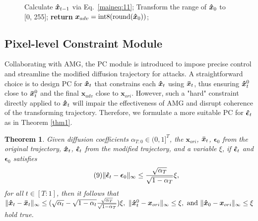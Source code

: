 \documentclass{article}
\newtheorem{theorem}{Theorem}
\begin{document}
\begin{figure}[t]
\begin{minipage}{0.9\linewidth}
\begin{algorithm}[H]
\begin{algorithmic}[1]
            \STATE Calculate $\boldsymbol{\Hat{x}}_{t-1}$ via Eq.~\eqref{maineq:11}; 
        \ENDFOR
        \STATE Transform the range of $\boldsymbol{\Hat{x}}_{0}$ to [0, 255]; 
        \STATE \textbf{return} $\boldsymbol{x}_{adv} = \text{int8}(\text{round}(\boldsymbol{\Hat{x}}_{0}))$; 
    \end{algorithmic}
\label{alg:1}
\end{algorithm}
\end{minipage}
\vspace{-0.4cm}
\end{figure}

\subsection{Pixel-level Constraint Module}
\label{sec:3.3}

Collaborating with AMG, the PC module is introduced to impose precise control and streamline the modified diffusion trajectory for attacks. 
A straightforward choice is to design PC for $\boldsymbol{\Hat{x}}_t$ that constrains each $\boldsymbol{\Hat{x}}_t$ using $\boldsymbol{\Bar{x}}_t$, thus ensuring $\boldsymbol{\Hat{x}}_{t}^{0}$ close to $\boldsymbol{\Bar{x}}_{t}^{0}$ and the final $\boldsymbol{x}_{adv}$ close to $\boldsymbol{x}_{ori}$. However, such a "hard" constraint directly applied to $\boldsymbol{\Hat{x}}_t$ will impair the effectiveness of AMG and disrupt {coherence of the transforming trajectory.} Therefore, we formulate a more suitable PC for $\boldsymbol{\Hat{\epsilon}}_{t}$ as in {Theorem} \ref{thm1}.

\begin{theorem}
\label{mainthm1}
    Given diffusion coefficients $\alpha_{T:0}\in(0,1]^T$, the $\boldsymbol{x}_{ori}$, $\boldsymbol{\Bar{x}}_{t}$, $\boldsymbol{\epsilon}_0$ from the original trajectory, $\boldsymbol{\Hat{x}}_{t}$, $\boldsymbol{\Hat{\epsilon}}_{t}$ from the modified trajectory, and a variable $\xi$, if $\boldsymbol{\Hat{\epsilon}}_{t}$ and $\boldsymbol{{\epsilon}}_{0}$ satisfies 
    \begin{equation}\tag{9}
        \|\boldsymbol{\Hat{\epsilon}}_{t} - \boldsymbol{\epsilon}_{0}\|_{\infty} \leq \frac{\sqrt{\alpha_T}}{\sqrt{1-\alpha_T}}\xi,
    \label{maineq:9}
    \end{equation}
    for all $t\in[T:1]$, then it follows that 
        $\|\boldsymbol{\Hat{x}}_{t} - \boldsymbol{\Bar{x}}_{t}\|_{\infty} \leq (\sqrt{\alpha_{t}} - \sqrt{1 - \alpha_{t}} \frac{\sqrt{\alpha_T}}{\sqrt{1-\alpha_T}})\xi, \ \|\boldsymbol{\Hat{x}}_{t}^{0} - \boldsymbol{x}_{ori}\|_{\infty}\leq\xi, \ \text{and}\ \|\boldsymbol{\Hat{x}}_{0} - \boldsymbol{x}_{ori}\|_{\infty}\leq\xi$
    hold true.
\end{theorem}
\end{document}
